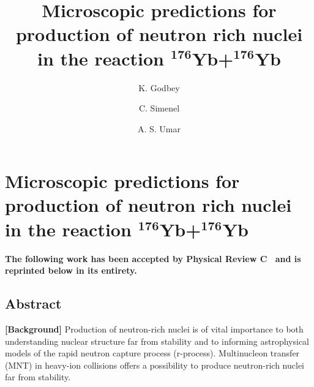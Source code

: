 
\chapter{Microscopic predictions for production of neutron rich nuclei in the reaction $^\mathbf{176}\mathbf{Yb}$+${}^\mathbf{176}\mathbf{Yb}$}\label{chapters:chapter_8}

\title{Microscopic predictions for production of neutron rich nuclei in the reaction $^\mathbf{176}\mathbf{Yb}$+${}^\mathbf{176}\mathbf{Yb}$}

\author[1]{K. Godbey}
\author[2]{C. Simenel}
\author[1]{A. S. Umar}


{
	\bfseries\centering
	The following work has been accepted by Physical Review C~\citep{godbey2020b} and is reprinted below in its entirety.
	\makeatletter
	\begin{center}\large\bfseries
		\@title
		\par\end{center}
	\begin{center}
		\AB@authlist
		\AB@affillist
	\end{center}
	\makeatother
}
\makeatletter
\renewcommand{\AB@affillist}{}
\renewcommand{\AB@authlist}{}
\setcounter{authors}{0}
\makeatother


\section*{Abstract}

		{\bf [Background]}
		Production of neutron-rich nuclei is of vital importance to both understanding nuclear structure far from stability and to informing astrophysical models of the rapid neutron capture process (r-process). Multinucleon transfer (MNT) in heavy-ion collisions offers a possibility to produce neutron-rich nuclei far from stability.
		
